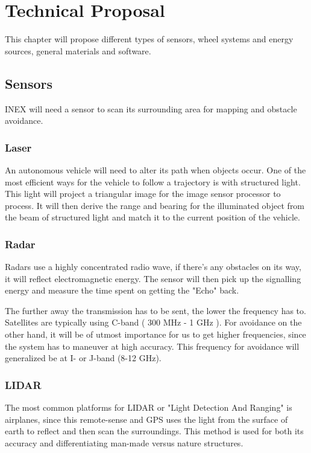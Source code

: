 \chapter{Technical Proposal}\label{ch:solutionProposal}
This chapter will propose different types of sensors, wheel systems and energy sources, general materials and software.

\section{Sensors}
INEX will need a sensor to scan its surrounding area for mapping and obstacle avoidance.

\subsection{Laser}
An autonomous vehicle will need to alter its path when objects occur. One of the most efficient ways for the vehicle to follow a trajectory is with structured light.\\This light will project a triangular image for the image sensor processor to process. It will then derive the range and bearing for the illuminated object from the beam of  structured light and match it to the current position of the vehicle\cite{Lasers}.


\subsection{Radar}
Radars use a highly concentrated radio wave, if there's any obstacles on its way, it will reflect electromagnetic energy. The sensor will then pick up the signalling energy and measure the time spent on getting the "Echo" back\cite{Radar}.

The further away the transmission has to be sent, the lower the frequency has to.
Satellites are typically using C-band ( 300 MHz - 1 GHz ). 
For avoidance on the other hand, it will be of utmost importance for us to get higher frequencies, since the system has to maneuver at high accuracy. This frequency for avoidance will generalized be at I- or J-band (8-12 GHz)\cite{RadarTutorial}.



\subsection{LIDAR}
The most common platforms for LIDAR or "Light Detection And Ranging" is airplanes,
since this remote-sense and GPS uses the light from the surface of earth to
reflect and then scan the surroundings. This method is used for both its accuracy
and differentiating man-made versus nature structures\cite{LIDAR}.

